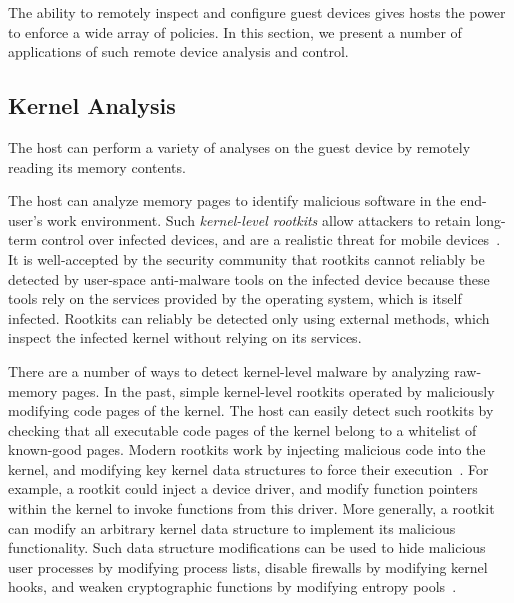 \label{section:policy}

The ability to remotely inspect and configure guest devices gives hosts the
power to enforce a wide array of policies. In this section, we present a number
of applications of such remote device analysis and control.

\subsection{Kernel Analysis}
\label{section:policy:analysis}

The host can perform a variety of analyses on the guest device by remotely
reading its memory contents.

 The host can analyze memory pages to
identify malicious software in the end-user's work environment. Such
\textit{kernel-level rootkits} allow attackers to retain long-term control over
infected devices, and are a realistic threat for mobile
devices~\cite{hotmobile10,mobisys11}. It is well-accepted by the security
community that rootkits cannot reliably be detected by user-space anti-malware
tools on the infected device because these tools rely on the services provided
by the operating system, which is itself infected. Rootkits can reliably be
detected only using external methods, which inspect the infected kernel without
relying on its services.

There are a number of ways to detect kernel-level malware by analyzing
raw-memory pages. In the past, simple kernel-level rootkits operated by
maliciously modifying code pages of the kernel. The host can easily detect such
rootkits by checking that all executable code pages of the kernel belong to a
whitelist of known-good pages.  Modern rootkits work by injecting malicious
code into the kernel, and modifying key kernel data structures to force their
execution~\cite{sbcfi:ccs07}. For example, a rootkit could inject a device
driver, and modify function pointers within the kernel to invoke functions from
this driver. More generally, a rootkit can modify an arbitrary kernel data
structure to implement its malicious functionality. Such data structure
modifications can be used to hide malicious user processes by modifying process
lists, disable firewalls by modifying kernel hooks, and weaken cryptographic
functions by modifying entropy pools~\cite{shadows:oakland07}.

